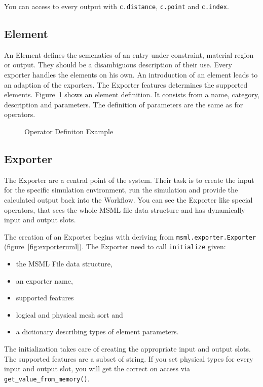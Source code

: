 You can access to every output with
\lstinline{c.distance}, \lstinline{c.point} and \lstinline{c.index}.

\subsection{Element}
\label{sec:element}

An Element defines the semenatics of an entry under constraint,
material region or output. They should be a disambiguous description
of their use. Every exporter handles the elements on his own. An
introduction of an element leads to an adaption of the exporters.
The Exporter features determines the supported elements.
Figure~\ref{fig:elementxml} shows an element definition. It consists
from a name, category, description and parameters. The definition of
parameters are the same as for operators.

\begin{figure}
  \centering
  
  \caption{Operator Definiton Example}
  \label{fig:elementxml}
\end{figure}

\subsection{Exporter}
\label{sec:exporter}

The Exporter are a central point of the system. Their task is to
create the input for the specific simulation environment, run the
simulation and provide the calculated output back into the Workflow.
You can see the Exporter like special operators, that sees the whole
MSML file data structure and has dynamically input and output slots.

The creation of an Exporter begins with deriving from
\texttt{msml.exporter.Exporter} (figure~\ref{fig:exporteruml}). The
Exporter need to call \texttt{initialize} given:

\begin{itemize}
\item the MSML File data structure,
\item an exporter name,
\item supported features
\item logical and physical mesh sort and
\item a dictionary describing types of element parameters.
\end{itemize}

The initialization takes care of creating the appropriate input and
output slots. The supported features are  a subset of string.
If you set physical types for every input and output slot, you will
get the correct on access via \texttt{get\_value\_from\_memory()}.

